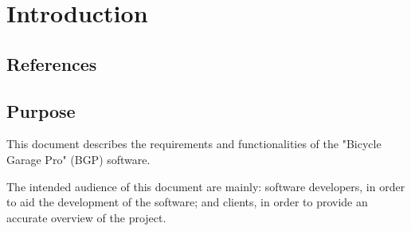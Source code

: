 \documentclass[12pt,titlepage,bibliography=totoc]{article}
\begin{document}


\maketitle
\newpage
\tableofcontents
\thispagestyle{empty}
\setcounter{page}{0}
\newpage

\section{Introduction}
\subsection{References}
\subsection{Purpose}
This document describes the requirements and functionalities of the "Bicycle Garage Pro" (BGP) software.

The intended audience of this document are mainly: software developers, in order to aid the development of the software; and clients, in order to provide an accurate overview of the project.
\end{document}
